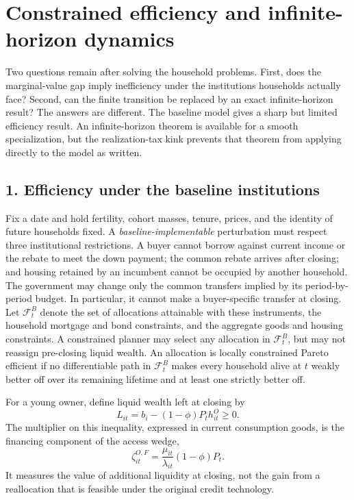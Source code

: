\documentclass[11pt]{article}
\begin{document}
\section*{Constrained efficiency and infinite-horizon dynamics}

Two questions remain after solving the household problems.  First, does the
marginal-value gap imply inefficiency under the institutions households
actually face?  Second, can the finite transition be replaced by an exact
infinite-horizon result?  The answers are different.  The baseline model gives
a sharp but limited efficiency result.  An infinite-horizon theorem is
available for a smooth specialization, but the realization-tax kink prevents
that theorem from applying directly to the model as written.

\subsection*{1. Efficiency under the baseline institutions}

Fix a date and hold fertility, cohort masses, tenure, prices, and the identity
of future households fixed.  A \emph{baseline-implementable} perturbation must
respect three institutional restrictions.  A buyer cannot borrow against
current income or the rebate to meet the down payment; the common rebate
arrives after closing; and housing retained by an incumbent cannot be occupied
by another household.  The government may change only the common transfers
implied by its period-by-period budget.  In particular, it cannot make a
buyer-specific transfer at closing.  Let $\mathcal F_t^B$ denote the set of
allocations attainable with these instruments, the household mortgage and bond
constraints, and the aggregate goods and housing constraints.  A constrained
planner may select any allocation in $\mathcal F_t^B$, but may not reassign
pre-closing liquid wealth.  An allocation is locally constrained Pareto
efficient if no differentiable path in $\mathcal F_t^B$ makes every household
alive at $t$ weakly better off over its remaining lifetime and at least one
strictly better off.

For a young owner, define liquid wealth left at closing by
\begin{equation}
 L_{it}=b_i-(1-\phi)P_th_{it}^{O}\geq 0.
 \label{eq:liquidity_slack}
\end{equation}
The multiplier on this inequality, expressed in current consumption goods, is
the financing component of the access wedge,
\begin{equation}
 \zeta_{it}^{O,F}=\frac{\mu_{it}}{\lambda_{it}}(1-\phi)P_t.
 \label{eq:financing_wedge}
\end{equation}
It measures the value of additional liquidity at closing, not the gain from a
reallocation that is feasible under the original credit technology.
\end{document}
